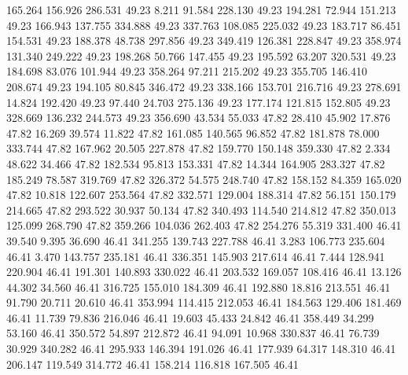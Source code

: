  165.264  156.926  286.531        49.23
   8.211   91.584  228.130        49.23
 194.281   72.944  151.213        49.23
 166.943  137.755  334.888        49.23
 337.763  108.085  225.032        49.23
 183.717   86.451  154.531        49.23
 188.378   48.738  297.856        49.23
 349.419  126.381  228.847        49.23
 358.974  131.340  249.222        49.23
 198.268   50.766  147.455        49.23
 195.592   63.207  320.531        49.23
 184.698   83.076  101.944        49.23
 358.264   97.211  215.202        49.23
 355.705  146.410  208.674        49.23
 194.105   80.845  346.472        49.23
 338.166  153.701  216.716        49.23
 278.691   14.824  192.420        49.23
  97.440   24.703  275.136        49.23
 177.174  121.815  152.805        49.23
 328.669  136.232  244.573        49.23
 356.690   43.534   55.033        47.82
  28.410   45.902   17.876        47.82
  16.269   39.574   11.822        47.82
 161.085  140.565   96.852        47.82
 181.878   78.000  333.744        47.82
 167.962   20.505  227.878        47.82
 159.770  150.148  359.330        47.82
   2.334   48.622   34.466        47.82
 182.534   95.813  153.331        47.82
  14.344  164.905  283.327        47.82
 185.249   78.587  319.769        47.82
 326.372   54.575  248.740        47.82
 158.152   84.359  165.020        47.82
  10.818  122.607  253.564        47.82
 332.571  129.004  188.314        47.82
  56.151  150.179  214.665        47.82
 293.522   30.937   50.134        47.82
 340.493  114.540  214.812        47.82
 350.013  125.099  268.790        47.82
 359.266  104.036  262.403        47.82
 254.276   55.319  331.400        46.41
  39.540    9.395   36.690        46.41
 341.255  139.743  227.788        46.41
   3.283  106.773  235.604        46.41
   3.470  143.757  235.181        46.41
 336.351  145.903  217.614        46.41
   7.444  128.941  220.904        46.41
 191.301  140.893  330.022        46.41
 203.532  169.057  108.416        46.41
  13.126   44.302   34.560        46.41
 316.725  155.010  184.309        46.41
 192.880   18.816  213.551        46.41
  91.790   20.711   20.610        46.41
 353.994  114.415  212.053        46.41
 184.563  129.406  181.469        46.41
  11.739   79.836  216.046        46.41
  19.603   45.433   24.842        46.41
 358.449   34.299   53.160        46.41
 350.572   54.897  212.872        46.41
  94.091   10.968  330.837        46.41
  76.739   30.929  340.282        46.41
 295.933  146.394  191.026        46.41
 177.939   64.317  148.310        46.41
 206.147  119.549  314.772        46.41
 158.214  116.818  167.505        46.41
